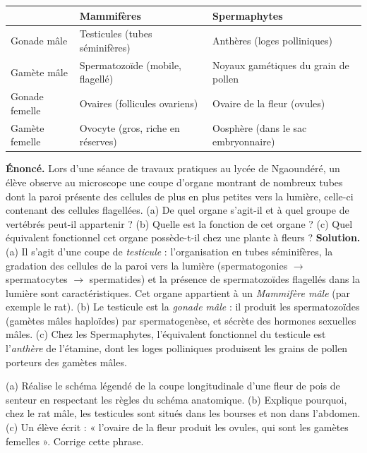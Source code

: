 \documentclass[11pt]{article}
\begin{document}
\begin{center}
\begin{tabularx}{\linewidth}{|l|X|X|}
\hline
\rowcolor{popblueL} & \textbf{Mammifères} & \textbf{Spermaphytes} \\
\hline
Gonade mâle & Testicules (tubes séminifères) & Anthères (loges polliniques) \\
\hline
Gamète mâle & Spermatozoïde (mobile, flagellé) & Noyaux gamétiques du grain de pollen \\
\hline
Gonade femelle & Ovaires (follicules ovariens) & Ovaire de la fleur (ovules) \\
\hline
Gamète femelle & Ovocyte (gros, riche en réserves) & Oosphère (dans le sac embryonnaire) \\
\hline
\end{tabularx}
\end{center}

\begin{exoresolu}
\textbf{Énoncé.} Lors d'une séance de travaux pratiques au lycée de Ngaoundéré, un élève observe au microscope une coupe d'organe montrant de nombreux tubes dont la paroi présente des cellules de plus en plus petites vers la lumière, celle-ci contenant des cellules flagellées. (a) De quel organe s'agit-il et à quel groupe de vertébrés peut-il appartenir ? (b) Quelle est la fonction de cet organe ? (c) Quel équivalent fonctionnel cet organe possède-t-il chez une plante à fleurs ?
\tcblower
\textbf{Solution.} (a) Il s'agit d'une coupe de \emph{testicule} : l'organisation en tubes séminifères, la gradation des cellules de la paroi vers la lumière (spermatogonies $\rightarrow$ spermatocytes $\rightarrow$ spermatides) et la présence de spermatozoïdes flagellés dans la lumière sont caractéristiques. Cet organe appartient à un \emph{Mammifère mâle} (par exemple le rat). (b) Le testicule est la \emph{gonade mâle} : il produit les spermatozoïdes (gamètes mâles haploïdes) par spermatogenèse, et sécrète des hormones sexuelles mâles. (c) Chez les Spermaphytes, l'équivalent fonctionnel du testicule est l'\emph{anthère} de l'étamine, dont les loges polliniques produisent les grains de pollen porteurs des gamètes mâles.
\end{exoresolu}

\begin{exercice}
(a) Réalise le schéma légendé de la coupe longitudinale d'une fleur de pois de senteur en respectant les règles du schéma anatomique. (b) Explique pourquoi, chez le rat mâle, les testicules sont situés dans les bourses et non dans l'abdomen. (c) Un élève écrit : « l'ovaire de la fleur produit les ovules, qui sont les gamètes femelles ». Corrige cette phrase.
\end{exercice}
\end{document}
